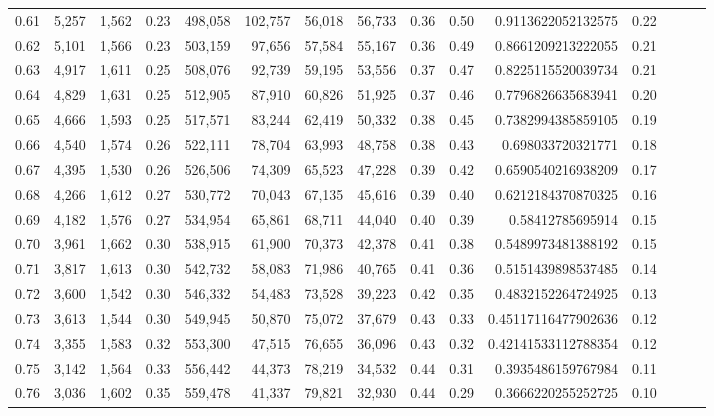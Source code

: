 \begin{tabular}{rrrrrrrrrrrrrrr}
0.61 &   5,257 &  1,562 &  0.23 &  498,058 &  102,757 &   56,018 &   56,733 &  0.36 &  0.50 &    0.9113622052132575 &      0.22 \\
0.62 &   5,101 &  1,566 &  0.23 &  503,159 &   97,656 &   57,584 &   55,167 &  0.36 &  0.49 &    0.8661209213222055 &      0.21 \\
0.63 &   4,917 &  1,611 &  0.25 &  508,076 &   92,739 &   59,195 &   53,556 &  0.37 &  0.47 &    0.8225115520039734 &      0.21 \\
0.64 &   4,829 &  1,631 &  0.25 &  512,905 &   87,910 &   60,826 &   51,925 &  0.37 &  0.46 &    0.7796826635683941 &      0.20 \\
0.65 &   4,666 &  1,593 &  0.25 &  517,571 &   83,244 &   62,419 &   50,332 &  0.38 &  0.45 &    0.7382994385859105 &      0.19 \\
0.66 &   4,540 &  1,574 &  0.26 &  522,111 &   78,704 &   63,993 &   48,758 &  0.38 &  0.43 &     0.698033720321771 &      0.18 \\
0.67 &   4,395 &  1,530 &  0.26 &  526,506 &   74,309 &   65,523 &   47,228 &  0.39 &  0.42 &    0.6590540216938209 &      0.17 \\
0.68 &   4,266 &  1,612 &  0.27 &  530,772 &   70,043 &   67,135 &   45,616 &  0.39 &  0.40 &    0.6212184370870325 &      0.16 \\
0.69 &   4,182 &  1,576 &  0.27 &  534,954 &   65,861 &   68,711 &   44,040 &  0.40 &  0.39 &      0.58412785695914 &      0.15 \\
0.70 &   3,961 &  1,662 &  0.30 &  538,915 &   61,900 &   70,373 &   42,378 &  0.41 &  0.38 &    0.5489973481388192 &      0.15 \\
0.71 &   3,817 &  1,613 &  0.30 &  542,732 &   58,083 &   71,986 &   40,765 &  0.41 &  0.36 &    0.5151439898537485 &      0.14 \\
0.72 &   3,600 &  1,542 &  0.30 &  546,332 &   54,483 &   73,528 &   39,223 &  0.42 &  0.35 &    0.4832152264724925 &      0.13 \\
0.73 &   3,613 &  1,544 &  0.30 &  549,945 &   50,870 &   75,072 &   37,679 &  0.43 &  0.33 &   0.45117116477902636 &      0.12 \\
0.74 &   3,355 &  1,583 &  0.32 &  553,300 &   47,515 &   76,655 &   36,096 &  0.43 &  0.32 &   0.42141533112788354 &      0.12 \\
0.75 &   3,142 &  1,564 &  0.33 &  556,442 &   44,373 &   78,219 &   34,532 &  0.44 &  0.31 &    0.3935486159767984 &      0.11 \\
0.76 &   3,036 &  1,602 &  0.35 &  559,478 &   41,337 &   79,821 &   32,930 &  0.44 &  0.29 &    0.3666220255252725 &      0.10 \\

\end{tabular}
